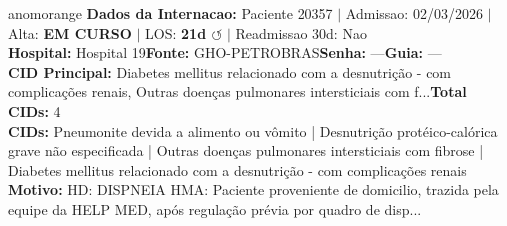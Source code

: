 \documentclass[a4paper,10pt]{article}
\begin{document}
\begin{anomalycard}[Internacao 167502 | GHO-PETROBRAS | ALTO (z=3.36)]{anomorange}
\textbf{Dados da Internacao:} Paciente 20357 $\mid$ Admissao: 02/03/2026 $\mid$ Alta: \textcolor{anomorange}{\textbf{EM CURSO}} $\mid$ LOS: \textbf{21d \textcolor{anomorange}{$\circlearrowleft$}} $\mid$ Readmissao 30d: Nao\\
\textbf{Hospital:} Hospital 19\quad\textbf{Fonte:} GHO-PETROBRAS\quad\textbf{Senha:} ---\quad\textbf{Guia:} ---\\
\textbf{CID Principal:} {\small Diabetes mellitus relacionado com a desnutrição - com complicações renais, Outras doenças pulmonares intersticiais com f...}\quad\textbf{Total CIDs:} 4\\

\textbf{CIDs:} {\scriptsize Pneumonite devida a alimento ou vômito | Desnutrição protéico-calórica grave não especificada | Outras doenças pulmonares intersticiais com fibrose | Diabetes mellitus relacionado com a desnutrição - com complicações renais}\\

\textbf{Motivo:} {\scriptsize HD: DISPNEIA   HMA: Paciente proveniente de domicilio, trazida pela equipe da HELP MED, após regulação prévia por quadro de disp...}\\


\end{anomalycard}
\end{document}
